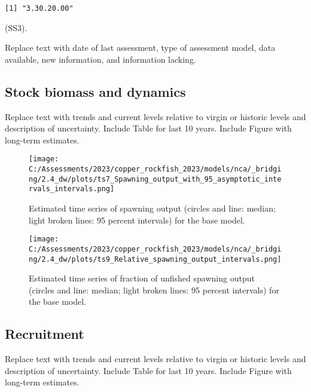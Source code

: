 \documentclass[11pt,
  english,
  letterpaper,
]{article}
\begin{document}
\begin{verbatim}
[1] "3.30.20.00"
\end{verbatim}

(SS3).

Replace text with date of last assessment, type of assessment model, data available, new information, and information lacking.

\hypertarget{stock-biomass-and-dynamics}{%
\subsection*{Stock biomass and dynamics}\label{stock-biomass-and-dynamics}}

Replace text with trends and current levels relative to virgin or historic levels and description of uncertainty. Include Table for last 10 years. Include Figure with long-term estimates.



\begin{figure}
\centering
\texttt{[image: C:/Assessments/2023/copper\_rockfish\_2023/models/nca/\_bridging/2.4\_dw/plots/ts7\_Spawning\_output\_with\_95\_asymptotic\_intervals\_intervals.png]}
\caption{Estimated time series of spawning output (circles and line: median; light broken lines: 95 percent intervals) for the base model.\label{fig:es-sb}}
\end{figure}

\begin{figure}
\centering
\texttt{[image: C:/Assessments/2023/copper\_rockfish\_2023/models/nca/\_bridging/2.4\_dw/plots/ts9\_Relative\_spawning\_output\_intervals.png]}
\caption{Estimated time series of fraction of unfished spawning output (circles and line: median; light broken lines: 95 percent intervals) for the base model.\label{fig:es-depl}}
\end{figure}

\clearpage

\hypertarget{recruitment}{%
\subsection*{Recruitment}\label{recruitment}}

Replace text with trends and current levels relative to virgin or historic levels and description of uncertainty. Include Table for last 10 years. Include Figure with long-term estimates.
\end{document}
